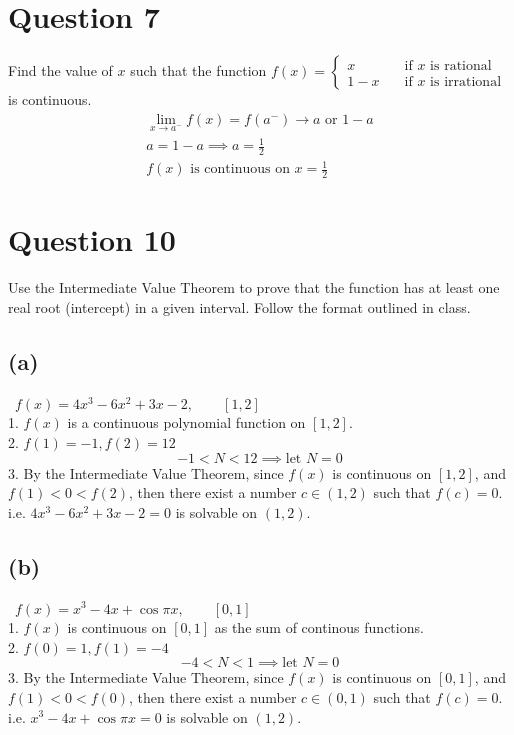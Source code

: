 \documentclass[12pt]{article}
\newcommand{\tor}{\text{ or }}
\begin{document}
\section{Question 7}
Find the value of $x$ such that the function $f(x) = \begin{cases}
    x \quad &\text{if $x$ is rational}\\
    1-x \quad &\text{if $x$ is irrational}
\end{cases}$ is continuous. \vspace{0.3em} \\
\begin{gather*}
    \lim_{x \to a^-} f(x) = f(a^-) \to a \tor 1-a\\
    a=1-a \implies a=\frac{1}{2}\\
    \boxed{f(x) \text{ is continuous on } x=\frac{1}{2}}
\end{gather*}

\section{Question 10}
Use the Intermediate Value Theorem to prove that the function has at least one real root (intercept) in a given interval. Follow the format outlined in class. \vspace{0.3em}

\subsection{(a)} \, $f(x)=4x^3 - 6x^2+3x-2, \qquad [1,2]$\\
1. $f(x)$ is a continuous polynomial function on $[1,2]$.\\
2. $f(1)=-1, f(2)=12$
\[
-1<N<12 \implies \text{let }N=0
\]
3. By the Intermediate Value Theorem, since $f(x)$ is continuous on $[1,2]$, and $f(1)<0<f(2)$, then there exist a number $c\in (1,2)$ such that $f(c)=0$. i.e. $4x^3 - 6x^2+3x-2=0$ is solvable on $(1,2).$ \vspace{0.3em}

\subsection{(b)} \, $f(x)=x^3-4x+\cos \pi x, \qquad [0,1]$\\
1. $f(x)$ is continuous on $[0,1]$ as the sum of continous functions.\\
2. $f(0)=1, f(1)=-4$
\[
-4<N<1 \implies \text{let } N=0
\]
3. By the Intermediate Value Theorem, since $f(x)$ is continuous on $[0,1]$, and $f(1)<0<f(0)$, then there exist a number $c\in (0,1)$ such that $f(c)=0$. i.e. $x^3-4x+\cos \pi x=0$ is solvable on $(1,2).$
\end{document}
